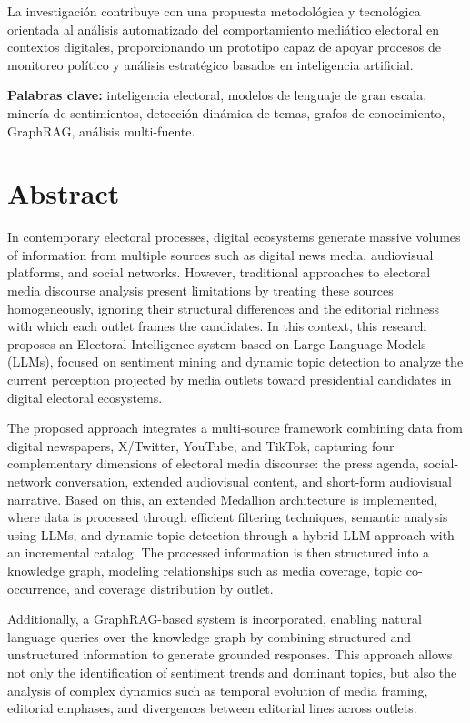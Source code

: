 La investigación contribuye con una propuesta metodológica y tecnológica orientada al análisis automatizado del comportamiento mediático electoral en contextos digitales, proporcionando un prototipo capaz de apoyar procesos de monitoreo político y análisis estratégico basados en inteligencia artificial.

\textbf{Palabras clave:} inteligencia electoral, modelos de lenguaje de gran escala, minería de sentimientos, detección dinámica de temas, grafos de conocimiento, GraphRAG, análisis multi-fuente.
\clearpage

\chapter*{Abstract}

In contemporary electoral processes, digital ecosystems generate massive volumes of information from multiple sources such as digital news media, audiovisual platforms, and social networks. However, traditional approaches to electoral media discourse analysis present limitations by treating these sources homogeneously, ignoring their structural differences and the editorial richness with which each outlet frames the candidates. In this context, this research proposes an Electoral Intelligence system based on Large Language Models (LLMs), focused on sentiment mining and dynamic topic detection to analyze the current perception projected by media outlets toward presidential candidates in digital electoral ecosystems.

The proposed approach integrates a multi-source framework combining data from digital newspapers, X/Twitter, YouTube, and TikTok, capturing four complementary dimensions of electoral media discourse: the press agenda, social-network conversation, extended audiovisual content, and short-form audiovisual narrative. Based on this, an extended Medallion architecture is implemented, where data is processed through efficient filtering techniques, semantic analysis using LLMs, and dynamic topic detection through a hybrid LLM approach with an incremental catalog. The processed information is then structured into a knowledge graph, modeling relationships such as media coverage, topic co-occurrence, and coverage distribution by outlet.

Additionally, a GraphRAG-based system is incorporated, enabling natural language queries over the knowledge graph by combining structured and unstructured information to generate grounded responses. This approach allows not only the identification of sentiment trends and dominant topics, but also the analysis of complex dynamics such as temporal evolution of media framing, editorial emphases, and divergences between editorial lines across outlets.

